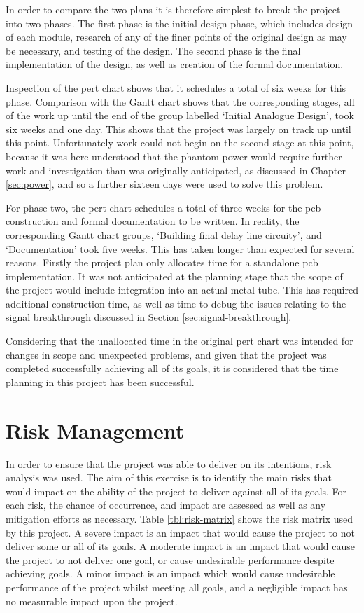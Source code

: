 In order to compare the two plans it is therefore simplest to break the project into two phases. The first phase is the initial design phase, which includes design of each module, research of any of the finer points of the original design as may be necessary, and testing of the design. The second phase is the final implementation of the design, as well as creation of the formal documentation.

Inspection of the \gls{pert} chart shows that it schedules a total of six weeks for this phase. Comparison with the Gantt chart shows that the corresponding stages, all of the work up until the end of the group labelled `Initial Analogue Design', took six weeks and one day. This shows that the project was largely on track up until this point. Unfortunately work could not begin on the second stage at this point, because it was here understood that the phantom power would require further work and investigation than was originally anticipated, as discussed in Chapter \ref{sec:power}, and so a further sixteen days were used to solve this problem.

For phase two, the \gls{pert} chart schedules a total of three weeks for the \gls{pcb} construction and formal documentation to be written. In reality, the corresponding Gantt chart groups, `Building final delay line circuity', and `Documentation' took five weeks. This has taken longer than expected for several reasons. Firstly the project plan only allocates time for a standalone \gls{pcb} implementation. It was not anticipated at the planning stage that the scope of the project would include integration into an actual metal tube. This has required additional construction time, as well as time to debug the issues relating to the signal breakthrough discussed in Section \ref{sec:signal-breakthrough}.

Considering that the unallocated time in the original \gls{pert} chart was intended for changes in scope and unexpected problems, and given that the project was completed successfully achieving all of its goals, it is considered that the time planning in this project has been successful.

\section{Risk Management}

In order to ensure that the project was able to deliver on its intentions, risk analysis was used. The aim of this exercise is to identify the main risks that would impact on the ability of the project to deliver against all of its goals. For each risk, the chance of occurrence, and impact are assessed as well as any mitigation efforts as necessary. Table \ref{tbl:risk-matrix} shows the risk matrix used by this project. A severe impact is an impact that would cause the project to not deliver some or all of its goals. A moderate impact is an impact that would cause the project to not deliver one goal, or cause undesirable performance despite achieving goals. A minor impact is an impact which would cause undesirable performance of the project whilst meeting all goals, and a negligible impact has no measurable impact upon the project.


